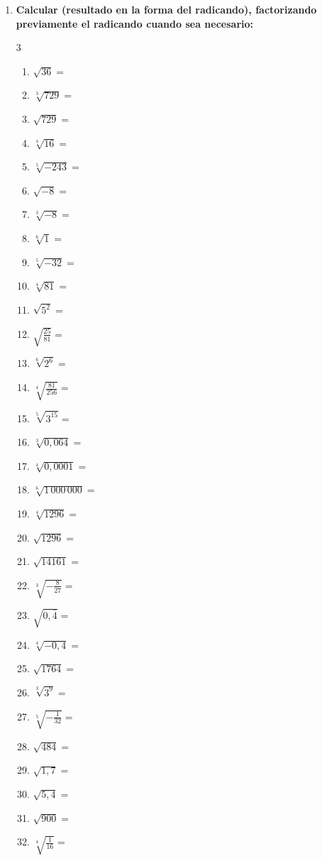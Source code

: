 \documentclass[10pt, a4paper]{article}
\begin{document}
\begin{enumerate}[start=4]
    \item \textbf{Calcular (resultado en la forma del radicando), factorizando previamente el radicando cuando sea necesario:}
    \begin{multicol}{3}
    \begin{enumerate}[label=\arabic*)]
        \item $\sqrt{36} =$
        \item $\sqrt[3]{729} =$
        \item $\sqrt{729} =$
        \item $\sqrt[4]{16} =$
        \item $\sqrt[5]{-243} =$
        \item $\sqrt{-8} =$
        \item $\sqrt[3]{-8} =$
        \item $\sqrt[6]{1} =$
        \item $\sqrt[5]{-32} =$
        \item $\sqrt[4]{81} =$
        \item $\sqrt{5^2} =$
        \item $\sqrt{\frac{25}{81}} =$
        \item $\sqrt[6]{2^6} =$
        \item $\sqrt[4]{\frac{81}{256}} =$
        \item $\sqrt[5]{3^{15}} =$
        \item $\sqrt[3]{0,064} =$
        \item $\sqrt[4]{0,0001} =$
        \item $\sqrt[6]{1\,000\,000} =$
        \item $\sqrt[4]{1296} =$
        \item $\sqrt{1296} =$
        \item $\sqrt{14161} =$
        \item $\sqrt[3]{-\frac{8}{27}} =$
        \item $\sqrt{0,\bar{4}} =$
        \item $\sqrt[4]{-0,4} =$
        \item $\sqrt{1764} =$
        \item $\sqrt[3]{3^9} =$
        \item $\sqrt[5]{-\frac{1}{32}} =$
        \item $\sqrt{484} =$
        \item $\sqrt{1,7} =$
        \item $\sqrt{5,4} =$
        \item $\sqrt{900} =$
        \item $\sqrt[4]{\frac{1}{16}} =$

\end{enumerate}
\end{multicol}
\end{enumerate}
\end{document}
